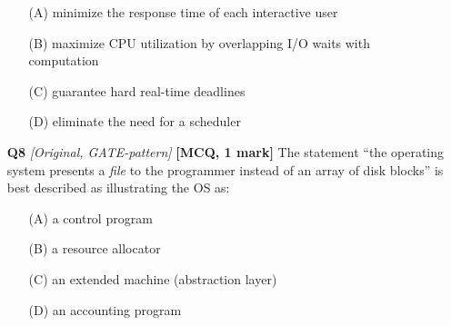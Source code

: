 \documentclass[11pt]{article}
\begin{document}
\begin{enumerate}
\begin{enumerate}
  \item[(A)] minimize the response time of each interactive user
  \item[(B)] maximize CPU utilization by overlapping I/O waits with computation
  \item[(C)] guarantee hard real-time deadlines
  \item[(D)] eliminate the need for a scheduler
\end{enumerate}

\item[\textbf{Q8}] \textit{[Original, GATE-pattern]} \textbf{[MCQ, 1 mark]} The statement ``the operating system presents a \emph{file} to the programmer instead of an array of disk blocks'' is best described as illustrating the OS as:

\begin{enumerate}
  \item[(A)] a control program
  \item[(B)] a resource allocator
  \item[(C)] an extended machine (abstraction layer)
  \item[(D)] an accounting program
\end{enumerate}

\end{enumerate}
\end{document}
